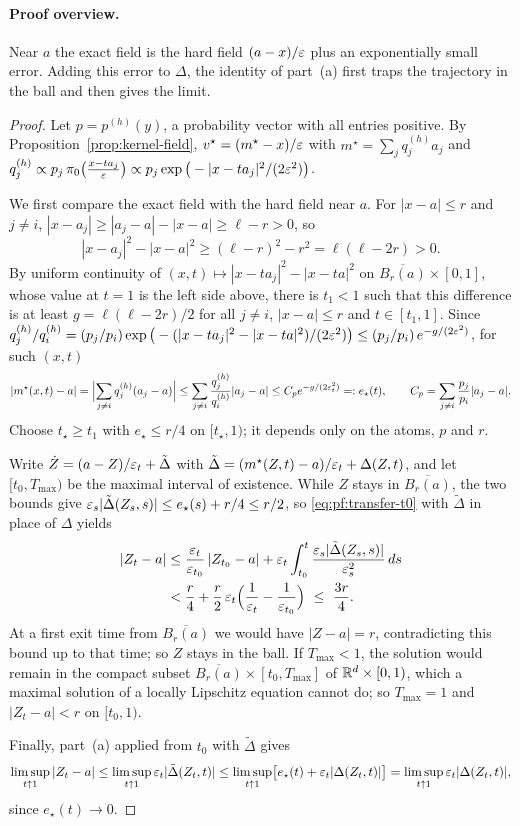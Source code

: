 \documentclass{article} %
\theoremstyle{plain}
\theoremstyle{definition}
\theoremstyle{remark}
\begin{document}
\paragraph{Proof overview.} Near $a$ the exact field is the hard field $(a-x)/\varepsilon$ plus an
exponentially small error. Adding this error to $\Delta$, the identity of
part~(a) first traps the trajectory in the ball and then gives the limit.
\begin{proof}
Let $p=p^{(h)}(y)$, a probability vector with all entries positive. By
Proposition~\ref{prop:kernel-field}, $v^\star=(m^\star-x)/\varepsilon$ with $m^\star=\sum_jq_j^{(h)}a_j$ and
$q_j^{(h)}\propto p_j\,\pi_0\big(\tfrac{x-ta_j}{\varepsilon}\big)\propto p_j\exp\big(-|x-ta_j|^2/(2\varepsilon^2)\big)$.

We first compare the exact field with the hard field near $a$. For $|x-a|\le r$ and $j\ne i$,
$|x-a_j|\ge|a_j-a|-|x-a|\ge \ell -r>0$, so
\[
|x-a_j|^2-|x-a|^2\ge(\ell -r)^2-r^2=\ell (\ell -2r)>0 .
\]
By uniform continuity of $(x,t)\mapsto|x-ta_j|^2-|x-ta|^2$ on $\overline{B_r(a)}\times[0,1]$,
whose value at $t=1$ is the left side above, there is $t_1<1$ such that this difference is at least
$g=\ell (\ell -2r)/2$ for all $j\ne i$, $|x-a|\le r$ and $t\in[t_1,1]$. Since
$q_j^{(h)}/q_i^{(h)}=(p_j/p_i)\exp\big(-(|x-ta_j|^2-|x-ta|^2)/(2\varepsilon^2)\big)\le(p_j/p_i)\,e^{-g/(2\varepsilon^2)}$,
for such $(x,t)$
\[
|m^\star(x,t)-a|=\Bigl|\sum_{j\ne i}q_j^{(h)}(a_j-a)\Bigr|\le\sum_{j\ne i}\frac{q_j^{(h)}}{q_i^{(h)}}|a_j-a|
\le C_pe^{-g/(2\varepsilon_t^2)}=:e_\star(t),\qquad C_p=\sum_{j\ne i}\frac{p_j}{p_i}|a_j-a|.
\]
Choose $t_\star\ge t_1$ with $e_\star\le r/4$ on $[t_\star,1)$; it depends only on the atoms, $p$
and $r$.

Write $\dot Z=(a-Z)/\varepsilon_t+\tilde\Delta$ with
$\tilde\Delta=(m^\star(Z,t)-a)/\varepsilon_t+\Delta(Z,t)$, and let $[t_0,T_{\max})$ be the maximal interval of
existence. While $Z$ stays in $\overline{B_r(a)}$, the two bounds give
$\varepsilon_s|\tilde\Delta(Z_s,s)|\le e_\star(s)+r/4\le r/2$, so \eqref{eq:pf:transfer-t0} with
$\tilde\Delta$ in place of $\Delta$ yields
\begin{align*}
|Z_t-a|
&\le\frac{\varepsilon_t}{\varepsilon_{t_0}}\,|Z_{t_0}-a|+\varepsilon_t\int_{t_0}^t\frac{\varepsilon_s|\tilde\Delta(Z_s,s)|}{\varepsilon_s^2}\,ds\\
&<\frac r4+\frac r2\,\varepsilon_t\Bigl(\frac1{\varepsilon_t}-\frac1{\varepsilon_{t_0}}\Bigr)\ \le\ \frac{3r}4 .
\end{align*}
At a first exit time from $\overline{B_r(a)}$ we would have $|Z-a|=r$, contradicting this
bound up to that time; so $Z$ stays in the ball. If $T_{\max}<1$, the solution would remain in the
compact subset $\overline{B_r(a)}\times[t_0,T_{\max}]$ of $\mathbb{R}^d\times[0,1)$, which a maximal
solution of a locally Lipschitz equation cannot do; so $T_{\max}=1$ and $|Z_t-a|<r$ on
$[t_0,1)$.

Finally, part~(a) applied from $t_0$ with $\tilde\Delta$ gives
\[
\limsup_{t\uparrow1}|Z_t-a|\le\limsup_{t\uparrow1}\varepsilon_t|\tilde\Delta(Z_t,t)|
\le\limsup_{t\uparrow1}\bigl[e_\star(t)+\varepsilon_t|\Delta(Z_t,t)|\bigr]
=\limsup_{t\uparrow1}\varepsilon_t|\Delta(Z_t,t)|,
\]
since $e_\star(t)\to0$.
\end{proof}
\end{document}
